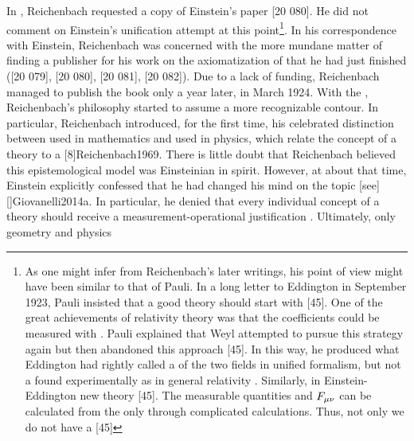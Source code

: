\documentclass[final]{article}
\renewcommand{\fmn}{\ensuremath{F\mn}\xspace}
\begin{document}
In , Reichenbach requested a copy of Einstein's paper  \citep{Einstein1923c} [20 080]. He did not comment on Einstein's unification attempt at this point\footnote{As one might infer from Reichenbach's later writings, his point of view might have been similar to that of Pauli. In a long letter to Eddington in September 1923, Pauli insisted that a good theory should start with  [45]. One of the great achievements of relativity theory was that the coefficients \gmn could be measured with \rac. Pauli explained that Weyl attempted to pursue this strategy again but then abandoned this approach [45]. In this way, he produced what Eddington had rightly called a  of the two fields in unified formalism, but not a  found experimentally as in general relativity \citep[see][197]{Eddington1923}. Similarly, in Einstein-Eddington new theory  [45]. The measurable quantities \gmn and \fmn can be calculated from the \Gtmn only through complicated calculations. Thus, not only we do not have a  [45]}. In his correspondence with Einstein, Reichenbach was concerned with the more mundane matter of finding a publisher for his work on the axiomatization of \sr that he had just finished ([20 079], [20 080], [20 081], [20 082]). Due to a lack of funding, Reichenbach managed to publish the book only a year later, in March 1924. With the  \citet{Reichenbach1924}, Reichenbach's philosophy started to assume a more recognizable contour. In particular, Reichenbach introduced, for the first time, his celebrated distinction between  used in mathematics and  used in physics, which relate the concept of a theory to a  [8]{Reichenbach1969}. There is little doubt that Reichenbach believed this epistemological model was Einsteinian in spirit. However, at about that time, Einstein explicitly confessed that he had changed his mind on the topic [see][]{Giovanelli2014a}. In particular, he denied that every individual concept of a theory should receive a measurement-operational justification \citep[1691]{Einstein1924}. Ultimately, only geometry and physics 
\end{document}
